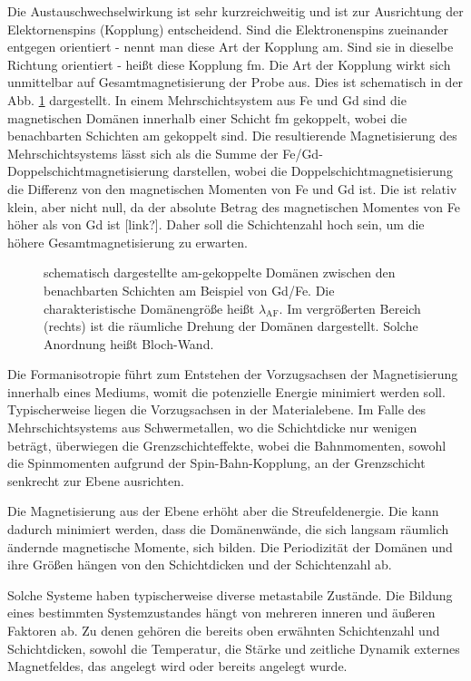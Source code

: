 \noindent
Die Austauschwechselwirkung ist sehr kurzreichweitig und ist zur Ausrichtung der Elektornenspins (Kopplung) entscheidend. Sind die Elektronenspins zueinander entgegen orientiert - nennt man diese Art der Kopplung \gls{am}. Sind sie in dieselbe Richtung orientiert - heißt diese Kopplung \gls{fm}. Die Art der Kopplung wirkt sich unmittelbar auf Gesamtmagnetisierung der Probe aus. Dies ist schematisch in der Abb. \ref{fig:am_fm_kopplung} dargestellt. In einem Mehrschichtsystem aus Fe und Gd sind die magnetischen Domänen innerhalb einer Schicht \gls{fm} gekoppelt, wobei die benachbarten Schichten \gls{am} gekoppelt sind. Die resultierende Magnetisierung des Mehrschichtsystems lässt sich als die Summe der Fe/Gd-Doppelschichtmagnetisierung darstellen, wobei die Doppelschichtmagnetisierung die Differenz von den magnetischen Momenten von Fe und Gd ist. Die ist relativ klein, aber nicht null, da der absolute Betrag des magnetischen Momentes von Fe höher als von Gd ist [link?]. Daher soll die Schichtenzahl hoch sein, um die höhere Gesamtmagnetisierung zu erwarten.
\begin{figure}[H]
    \centering
    
    \caption{schematisch dargestellte \gls{am}-gekoppelte Domänen zwischen den benachbarten Schichten am Beispiel von Gd/Fe. Die charakteristische Domänengröße heißt $\lambda_{\text{AF}}$. Im vergrößerten Bereich (rechts) ist die räumliche Drehung der Domänen dargestellt. Solche Anordnung heißt Bloch-Wand.}
    \label{fig:am_fm_kopplung}
\end{figure}
\noindent
Die Formanisotropie führt zum Entstehen der Vorzugsachsen der Magnetisierung innerhalb eines Mediums, womit die potenzielle Energie minimiert werden soll. Typischerweise liegen die Vorzugsachsen in der Materialebene. Im Falle des Mehrschichtsystems aus Schwermetallen, wo die Schichtdicke nur wenigen  beträgt, überwiegen die Grenzschichteffekte, wobei die Bahnmomenten, sowohl die Spinmomenten aufgrund der Spin-Bahn-Kopplung, an der Grenzschicht senkrecht zur Ebene ausrichten.

\noindent
Die Magnetisierung aus der Ebene erhöht aber die Streufeldenergie. Die kann dadurch minimiert werden, dass die Domänenwände, die sich langsam räumlich ändernde magnetische Momente, sich bilden. Die Periodizität der Domänen und ihre Größen hängen von den Schichtdicken und der Schichtenzahl ab. 

\noindent
Solche Systeme haben typischerweise diverse metastabile Zustände. Die Bildung eines bestimmten Systemzustandes hängt von mehreren inneren und äußeren Faktoren ab. Zu denen gehören die bereits oben erwähnten Schichtenzahl und Schichtdicken, sowohl die Temperatur, die Stärke und zeitliche Dynamik externes Magnetfeldes, das angelegt wird oder bereits angelegt wurde.

